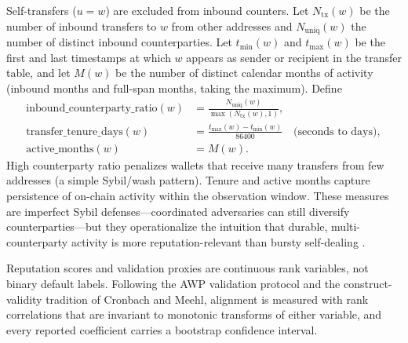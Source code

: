Self-transfers ($u=w$) are excluded from inbound counters. Let $N_{\mathrm{tx}}(w)$ be the number of inbound transfers to $w$ from other addresses and $N_{\mathrm{uniq}}(w)$ the number of distinct inbound counterparties. Let $t_{\min}(w)$ and $t_{\max}(w)$ be the first and last timestamps at which $w$ appears as sender or recipient in the transfer table, and let $M(w)$ be the number of distinct calendar months of activity (inbound months and full-span months, taking the maximum). Define
\begin{align}
\mathrm{inbound\_counterparty\_ratio}(w)
&=
\frac{N_{\mathrm{uniq}}(w)}{\max(N_{\mathrm{tx}}(w),1)},
\label{eq:counterparty-ratio}\\
\mathrm{transfer\_tenure\_days}(w)
&=
\frac{t_{\max}(w)-t_{\min}(w)}{86400}\quad\text{(seconds to days)},
\label{eq:tenure}\\
\mathrm{active\_months}(w)
&=
M(w).
\label{eq:active-months}
\end{align}
High counterparty ratio penalizes wallets that receive many transfers from few addresses (a simple Sybil/wash pattern). Tenure and active months capture persistence of on-chain activity within the observation window. These measures are imperfect Sybil defenses---coordinated adversaries can still diversify counterparties---but they operationalize the intuition that durable, multi-counterparty activity is more reputation-relevant than bursty self-dealing .


Reputation scores and validation proxies are continuous rank variables, not binary default labels. Following the AWP validation protocol and the construct-validity tradition of Cronbach and Meehl, alignment is measured with rank correlations that are invariant to monotonic transforms of either variable, and every reported coefficient carries a bootstrap confidence interval.

